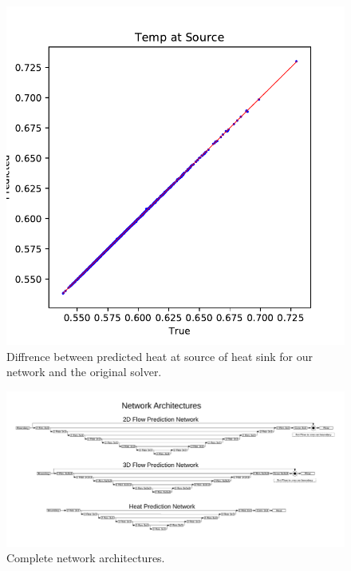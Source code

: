 \documentclass{article} %
\begin{document}
\begin{figure}[h]
\begin{center}
\includegraphics[scale=0.40]{../test/figs/heat_accuracy.pdf}
\end{center}
\caption{Diffrence between predicted heat at source of heat sink for our network and the original solver.}
\label{heat_accuracy}
\end{figure}


\begin{figure}[h]
\begin{center}
\includegraphics[scale=0.45]{./appendix_flow_net.pdf}
\end{center}
\caption{Complete network architectures.}
\label{network_architectures}
\end{figure}
\end{document}

